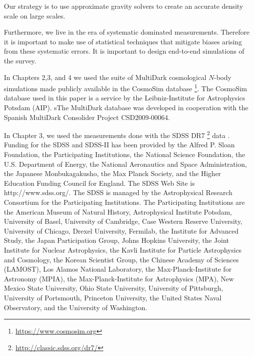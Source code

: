 Our strategy is to use approximate gravity solvers to create an accurate density scale on large scales.

Furthermore, we live in the era of systematic dominated measurements. 
Therefore it is important to make use of statistical techniques that mitigate 
biases arising from these systematic errors. It is important to design end-to-end simulations of the survey.


In Chapters 2,3, and 4 we used the suite of MultiDark cosmological $N$-body simulations made publicly available in the CosmoSim database \footnote{\url{https://www.cosmosim.org}}. The CosmoSim database used in this paper is a service by the Leibniz-Institute for Astrophysics Potsdam (AIP). sThe MultiDark database was developed in cooperation with the Spanish MultiDark Consolider Project CSD2009-00064.

In Chapter 3, we used the measurements done with the SDSS DR7 \footnote{\url{http://classic.sdss.org/dr7/}} data \citep{abazajian2009}. 
Funding for the SDSS and SDSS-II has been provided by the Alfred P. Sloan Foundation, the Participating Institutions, the National Science Foundation, the U.S. Department of Energy, the National Aeronautics and Space Administration, the Japanese Monbukagakusho, the Max Planck Society, and the Higher Education Funding Council for England. The SDSS Web Site is http://www.sdss.org/. The SDSS is managed by the Astrophysical Research Consortium for the Participating Institutions. The Participating Institutions are the American Museum of Natural History, Astrophysical Institute Potsdam, University of Basel, University of Cambridge, Case Western Reserve University, University of Chicago, Drexel University, Fermilab, the Institute for Advanced Study, the Japan Participation Group, Johns Hopkins University, the Joint Institute for Nuclear Astrophysics, the Kavli Institute for Particle Astrophysics and Cosmology, the Korean Scientist Group, the Chinese Academy of Sciences (LAMOST), Los Alamos National Laboratory, the Max-Planck-Institute for Astronomy (MPIA), the Max-Planck-Institute for Astrophysics (MPA), New Mexico State University, Ohio State University, University of Pittsburgh, University of Portsmouth, Princeton University, the United States Naval Observatory, and the University of Washington.

